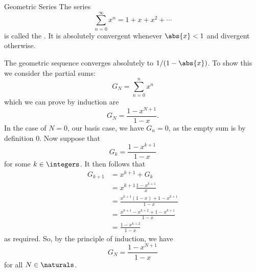 \documentclass[fleqn]{NotesClass}
\begin{document}
    \begin{exm}{Geometric Series}{}
        The series
        \begin{equation}
            \sum_{n=0}^{\infty} x^n = 1 + x + x^2 + \dotsb
        \end{equation}
        is called the .
        It is absolutely convergent whenever \(\abs{x}<1\) and divergent otherwise.
        
        The geometric sequence converges absolutely to \(1/(1-\abs{x})\).
        To show this we consider the partial sums:
        \begin{equation}
            G_N = \sum_{n=0}^{n}x^n
        \end{equation}
        which we can prove by induction are
        \begin{equation}
            G_N = \frac{1 - x^{N+1}}{1 - x}.
        \end{equation}
        In the case of \(N = 0\), our basis case, we have \(G_n = 0\), as the empty sum is by definition 0.
        Now suppose that
        \begin{equation}
            G_k = \frac{1 - x^{k+1}}{1 - x}
        \end{equation}
        for some \(k \in \integers\).
        It then follows that
        \begin{align}
            G_{k+1} &= x^{k+1} + G_{k}\\
            &= x^{k+1} \frac{1 - x^{k+1}}{x}\\
            &= \frac{x^{k+1}(1 - x) + 1 - x^{k+1}}{1 - x}\\
            &= \frac{x^{k+1} - x^{k+2} + 1 - x^{k+1}}{1 - x}\\
            &= \frac{1 - x^{k+2}}{1 - x}
        \end{align}
        as required.
        So, by the principle of induction, we have
        \begin{equation}
            G_N = \frac{1 - x^{N+1}}{1 - x}
        \end{equation}
        for all \(N \in \naturals\).
        

\end{exm}
\end{document}
